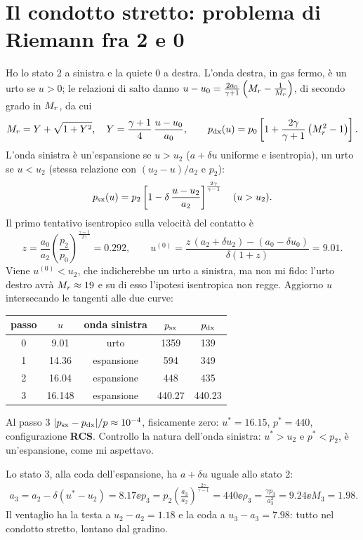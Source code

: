 \section*{Il condotto stretto: problema di Riemann fra 2 e 0}
Ho lo stato 2 a sinistra e la quiete 0 a destra. L'onda destra, in gas fermo, è un urto se $u>0$; le relazioni di
salto danno $u-u_0=\frac{2a_0}{\gamma+1}\left(M_{r}-\frac1{M_{r}}\right)$, di secondo grado in $M_{r}$, da cui
\[
  M_{r}=Y+\sqrt{1+Y^2},\quad Y=\frac{\gamma+1}{4}\,\frac{u-u_0}{a_0},\qquad
  p_{\rm dx}(u)=p_0\left[1+\frac{2\gamma}{\gamma+1}\left(M_{r}^2-1\right)\right].
\]
L'onda sinistra è un'espansione se $u>u_2$ ($a+\delta u$ uniforme e isentropia), un urto se $u<u_2$ (stessa relazione
con $(u_2-u)/a_2$ e $p_2$):
\[
  p_{\rm sx}(u)=p_2\left[1-\delta\,\frac{u-u_2}{a_2}\right]^{\frac{2\gamma}{\gamma-1}}\quad(u>u_2).
\]
Il primo tentativo isentropico sulla velocità del contatto è
\[
  z=\frac{a_0}{a_2}\left(\frac{p_2}{p_0}\right)^{\frac{\gamma-1}{2\gamma}}=\num{0.292},\qquad
  u^{(0)}=\frac{z\,(a_2+\delta u_2)-(a_0-\delta u_0)}{\delta(1+z)}=\num{9.01}.
\]
Viene $u^{(0)}<u_2$, che indicherebbe un urto a sinistra, ma non mi fido: l'urto destro avrà $M_{r}\approx19$ e su di
esso l'ipotesi isentropica non regge. Aggiorno $u$ intersecando le tangenti alle due curve:
\begin{table}[H]
  \centering
  \begin{tabular}{ccccc}
    \toprule
    passo & $u$ & onda sinistra & $p_{\rm sx}$ & $p_{\rm dx}$ \\
    \midrule
    0 & \num{9.01}  & urto        & \num{1359} & \num{139} \\
    1 & \num{14.36} & espansione  & \num{594}  & \num{349} \\
    2 & \num{16.04} & espansione  & \num{448}  & \num{435} \\
    3 & \num{16.148} & espansione & \num{440.27} & \num{440.23} \\
    \bottomrule
  \end{tabular}
\end{table}
Al passo 3 $|p_{\rm sx}-p_{\rm dx}|/p\approx10^{-4}$, fisicamente zero: $u^*=\num{16.15}$, $p^*=\num{440}$, configurazione
\textbf{RCS}. Controllo la natura dell'onda sinistra: $u^*>u_2$ e $p^*<p_2$, è un'espansione, come mi aspettavo.

Lo stato 3, alla coda dell'espansione, ha $a+\delta u$ uguale allo stato 2:
\begin{gather*}
  a_3=a_2-\delta\left(u^*-u_2\right)=\num{8.17}\ee
  p_3=p_2\left(\frac{a_3}{a_2}\right)^{\frac{2\gamma}{\gamma-1}}=\num{440}\ee
  \rho_3=\frac{\gamma p_3}{a_3^2}=\num{9.24}\ee M_3=\num{1.98}.
\end{gather*}
Il ventaglio ha la testa a $u_2-a_2=\num{1.18}$ e la coda a $u_3-a_3=\num{7.98}$: tutto nel condotto stretto, lontano
dal gradino.

